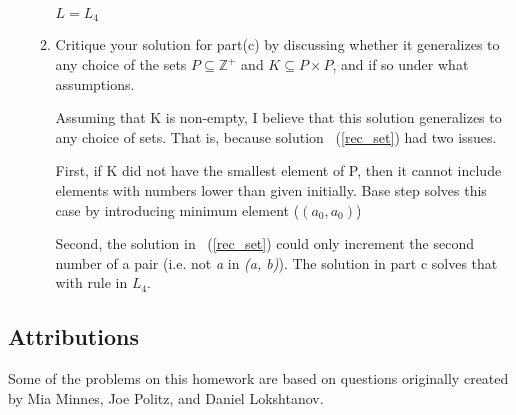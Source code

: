 \documentclass[12pt, oneside]{article}
\begin{document}
\begin{enumerate}
\begin{enumerate}
$L = L_4$

\item Critique your solution for part(c) by discussing whether it
generalizes to any choice of the sets $P \subseteq \mathbb{Z^+} $
and $K \subseteq P \times P$, and if so under what assumptions.

Assuming that K is non-empty, I believe that this solution generalizes to any choice of sets. That is, because solution ~(\ref{rec_set}) had two issues. 

First, if K did not have the smallest element of P, then it cannot include elements with numbers lower than given initially. Base step solves this case by introducing minimum element ($(a_0, a_0)$)

Second, the solution in ~(\ref{rec_set}) could only increment the second number of a pair (i.e. not \textit{a} in \textit{(a, b)}). The solution in part c solves that with rule in $L_4$.

\end{enumerate}
\end{enumerate}
\vfill
\subsection*{Attributions}
Some of the problems on this homework are based on questions
originally created by Mia Minnes, Joe Politz, and Daniel
Lokshtanov.
\end{document}
